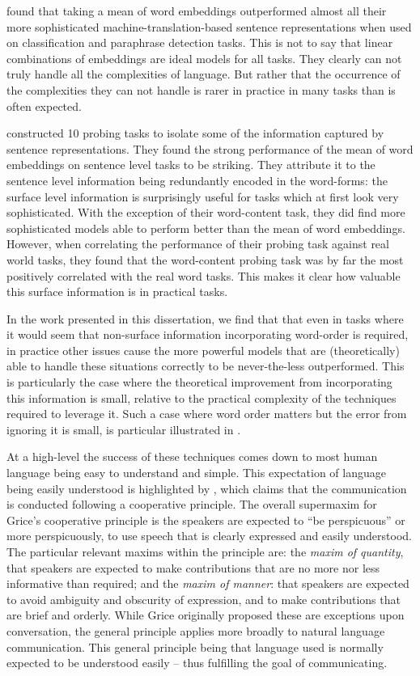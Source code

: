 \documentclass{book}
\begin{document}
\citet{acl2018bleuopposedmeaning} found that taking a mean of word embeddings outperformed almost all their more sophisticated machine-translation-based sentence representations when used on classification and paraphrase detection tasks.
This is not to say that linear combinations of embeddings are ideal models for all tasks.
They clearly can not truly handle all the complexities of language.
But rather that the occurrence of the complexities they can not handle is rarer in practice in many tasks than is often expected.

\citet{ac2018probingsentencevectors} constructed 10 probing tasks to isolate some of the information captured by sentence representations.
They found the strong performance of the mean of word embeddings on sentence level tasks to be striking.
They attribute it to the sentence level information being redundantly encoded in the word-forms: the surface level information is surprisingly useful for tasks which at first look very sophisticated.
With the exception of their word-content task, they did find more sophisticated models able to perform better than the mean of word embeddings.
However, when correlating the performance of their probing task against real world tasks,
they found that the word-content probing task was by far the most positively correlated with the real word tasks.
This makes it clear how valuable this surface information is in practical tasks.



In the work presented in this dissertation, 
we find that that even in tasks where it would seem that non-surface information incorporating word-order is required,
in practice other issues cause the more powerful models that are (theoretically) able to handle these situations correctly to be never-the-less outperformed.
This is particularly the case where the theoretical improvement from incorporating this information is small, relative to the practical complexity of the techniques required to leverage it.
Such a case where word order matters but the error from ignoring it is small, is particular illustrated in .

At a high-level the success of these techniques comes down to most human language being easy to understand and simple.
This expectation of language being easily understood is highlighted by \citet{grice1975logic}, which claims that the communication is conducted following a cooperative principle.
The overall supermaxim for Grice's cooperative principle is the speakers are expected to ``be perspicuous'' or more perspicuously, to use speech that is clearly expressed and easily understood.
The particular relevant maxims within the principle are:
the \emph{maxim of quantity}, that speakers are expected to make contributions that are no more nor less informative than required;
and the \emph{maxim of manner}: that speakers are expected to avoid ambiguity and obscurity of expression, and to make contributions that are brief and orderly.
While Grice originally proposed these are exceptions upon conversation, the general principle applies more broadly to natural language communication.
This general principle being that language used is normally expected to be understood easily -- thus fulfilling the goal of communicating.
\end{document}
